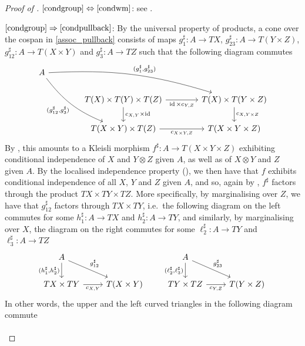 \documentclass[a4paper,UKenglish,numberwithinsect,cleveref, autoref, thm-restate]{lipics-v2021}
\theoremstyle{plain} %
\theoremstyle{definition} %
\begin{document}
\begin{proof}[Proof of ]
 $\ref{condgroup}\Leftrightarrow\ref{condwm}$: 
 see .
 
 $\ref{condgroup}\Rightarrow\ref{condpullback}$: 
 By the universal property of products, a cone over the cospan in \eqref{assoc_pullback} consists of maps $g_1^\sharp:A\to TX$, $g_{23}^\sharp:A\to T(Y\times Z)$, $g_{12}^\sharp:A\to T(X\times Y)$ and $g_3^\sharp:A\to TZ$ such that the following diagram commutes
 \[
  \begin{tikzcd}[column sep=3.3pc]
   A \ar[bend left=10]{drr}{(g_1^\sharp,g_{23}^\sharp)} \ar[bend right=15]{ddr}[swap]{(g_{12}^\sharp,g_3^\sharp)} \\
   & T(X) \times T(Y) \times T(Z) \ar{r}[swap]{\id \times c_{Y,Z}} \ar{d}{c_{X,Y} \times \id}	& T(X) \times T(Y \times Z) \ar{d}{c_{X,Y \times Z}}	\\
   & T(X \times Y) \times T(Z) \ar{r}[swap]{c_{X\times Y,Z}}						& T(X \times Y \times Z)
  \end{tikzcd}
 \]
 By , this amounts to a Kleisli morphism $f^\sharp:A\to T(X\times Y\times Z)$ exhibiting conditional independence of $X$ and $Y\otimes Z$ given $A$, as well as of $X\otimes Y$ and $Z$ given $A$. By the localised independence property (), we then have that $f$ exhibits conditional independence of all $X$, $Y$ and $Z$ given $A$, and so, again by , $f^\sharp$ factors through the product $TX\times TY\times TZ$. 
 More specifically, by marginalising over $Z$, we have that $g_{12}^\sharp$ factors through $TX\times TY$, i.e.~the following diagram on the left commutes for some $h_1^\sharp:A\to TX$ and $h_2^\sharp:A\to TY$, and similarly, by marginalising over $X$, the diagram on the right commutes for some $\ell_2^\sharp:A\to TY$ and $\ell_3^\sharp:A\to TZ$
 \[
  \begin{tikzcd}
   A \ar{d}[swap]{(h_1^\sharp,h_2^\sharp)} \ar{dr}{g_{12}^\sharp} \\
   TX\times TY \ar{r}[swap]{c_{X,Y}} & T(X\times Y) 
  \end{tikzcd}
  \qquad
  \begin{tikzcd}
   A \ar{d}[swap]{(\ell_2^\sharp,\ell_3^\sharp)} \ar{dr}{g_{23}^\sharp} \\
   TY\times TZ \ar{r}[swap]{c_{Y,Z}} & T(Y\times Z) 
  \end{tikzcd}
 \]
 In other words, the upper and the left curved triangles in the following diagram commute
\[
  \begin{tikzcd}[column sep=3.3pc]

\end{tikzcd}\]
\end{proof}
\end{document}
